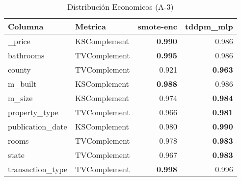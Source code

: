 \begin{table}[H]
\centering
\caption{Distribución Economicos (A-3)}
\label{table-shape-economicos-a-3}
\begin{tabular}{|l|l|r|r|}
\hline
\rowcolor[gray]{0.8}
Columna & Metrica & smote-enc & tddpm\_mlp \\
\hline \_price & KSComplement & \bfseries 0.990 & 0.986 \\
\hline bathrooms & TVComplement & \bfseries 0.995 & 0.986 \\
\hline county & TVComplement & 0.921 & \bfseries 0.963 \\
\hline m\_built & KSComplement & \bfseries 0.988 & 0.986 \\
\hline m\_size & KSComplement & 0.974 & \bfseries 0.984 \\
\hline property\_type & TVComplement & 0.966 & \bfseries 0.981 \\
\hline publication\_date & KSComplement & 0.980 & \bfseries 0.990 \\
\hline rooms & TVComplement & 0.978 & \bfseries 0.983 \\
\hline state & TVComplement & 0.967 & \bfseries 0.983 \\
\hline transaction\_type & TVComplement & \bfseries 0.998 & 0.996 \\
\hline
\end{tabular}
\end{table}
